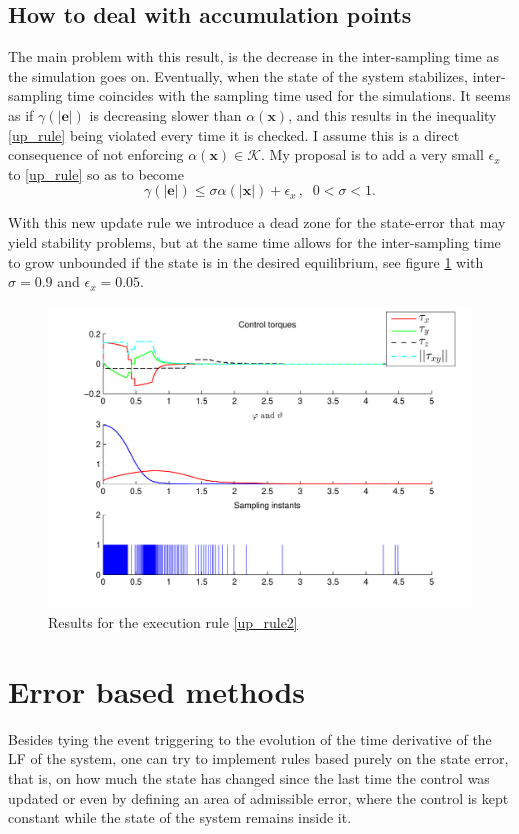 \documentclass{article}
\begin{document}
		\subsection{How to deal with accumulation points}
			The main problem with this result, is the decrease in the inter-sampling time as the simulation goes on. Eventually, when the state of the system stabilizes, inter-sampling time coincides with the sampling time used for the simulations. It seems as if $\gamma(|\mathbf{e}|)$ is decreasing slower than $\alpha(\mathbf{x})$, and this results in the inequality \eqref{up_rule} being violated every time it is checked. I assume this is a direct consequence of not enforcing $\alpha(\mathbf{x}) \in \mathcal{K}$. My proposal is to add a very small $\epsilon_{x}$ to \eqref{up_rule} so as to become
		\begin{equation}
			\gamma(|\mathbf{e}|) \leq \sigma \alpha(|\mathbf{x}|) + \epsilon_x\, , \;\; 0 < \sigma < 1.
			\label{up_rule2}
		\end{equation}
		
		With this new update rule we introduce a dead zone for the state-error that may yield stability problems, but at the same time allows for the inter-sampling time to grow unbounded if the state is in the desired equilibrium, see figure \ref{event_results2} with $\sigma = 0.9$ and $\epsilon_x = 0.05$.
		\begin{figure}
			\centering
			\includegraphics[width=\linewidth]{event_2}
			\caption{Results for the execution rule \eqref{up_rule2}\label{event_results2}}
		\end{figure}
		
	\section{Error based methods}
		Besides tying the event triggering to the evolution of the time derivative of the LF of the system, one can try to implement rules based purely on the state error, that is, on how much the state has changed since the last time the control was updated or even by defining an area of admissible error, where the control is kept constant while the state of the system remains inside it.
\end{document}
